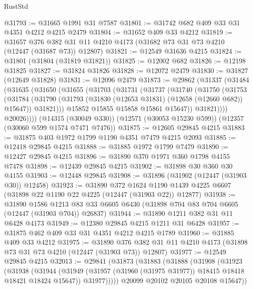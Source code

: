 \begin{lexlean}{RustStd}
\begin{coremodule}
@31793 := @31665 @1991 @31 @7587
@31801 := @31742 @682 @409 @33 @31 @4351 @4212 @4215 @2479
@31804 := @31652 @409 @33 @4212
@31819 := @31657
    @376
    @382
    @31
    @11
    @4210
    @4173
    (@31682 @73 @31 @73 @4210 (@12447 (@31687 @73)) @12807)
@31821 := @12549 @31636 @4215
@31824 := @31801 (@31804 (@31819 @31821))
@31825 := @12002 @682
@31826 := @12198 @31825
@31827 := @31824 @31826
@31828 := @12072 @2479
@31830 := @31827 (@12649 @31828)
@31831 := @12096 @2479
@31873 := @29862
    (@31337
      (@31484
        (@31635
          (@31650
            (@31655
              (@31703
                (@31731
                  (@31737
                    (@31740
                      (@31750
                        (@31753
                          (@31784
                            (@31790
                              (@31793 (@31830 (@12653 @31831) (@12658 (@12660 @682)) @15647))
                              @31821)))
                        @15852
                        @15855
                        @15858
                        @15861
                        @15647))
                    @31821))))
            @20026))))
    (@14315 (@30049 @330))
    (@12571 (@30053 @15230 @599))
    (@12357 (@30060 @599 @1574 @7471 @7476))
@31875 := @12605 @29845 @4215
@31883 := @31875 @403 @1972 @1799 @1190 @4351 @7479 @4215 @2093
@31885 := @12418 @29845 @4215
@31888 := @31885 @1972 @1799 @7479
@31890 := @12427 @29845 @4215
@31896 := @31890 @370 @1971 @360 @1798 @4155 @7478
@31898 := @12439 @29845 @4215
@31902 := @31898 @30 @360 @30 @4155
@31903 := @12448 @29845
@31908 := @31896 (@31902 (@12447 (@31903 @30)) @12458)
@31923 := @31890
    @372
    @1624
    @1190
    @1439
    @4225
    @6607
    (@31898 @22 @1190 @22 @4225 (@12447 (@31903 @22)) @12877)
@31938 := @31890
    @1586
    @1213
    @83
    @33
    @6605
    @6430
    (@31898 @704 @83 @704 @6605 (@12447 (@31903 @704)) @26837)
@31944 := @31890 @1211 @382 @31 @11 @6428 @4173
@31949 := @12380 @29845 @4215 @1211 @31 @6428
@31957 := @31875 @462 @409 @33 @31 @4351 @4212 @4215 @1789
@31960 := @31885 @409 @33 @4212
@31975 := @31890
    @376
    @382
    @31
    @11
    @4210
    @4173
    (@31898 @73 @31 @73 @4210 (@12447 (@31903 @73)) @12807)
@31977 := @12549 @29845 @4215
@32013 := @29841
    (@31873
      (@31883
        (@31888
          (@31908
            (@31923
              (@31938
                (@31944
                  (@31949 (@31957 (@31960 (@31975 @31977)) @18415 @18418 @18421 @18424 @15647))
                  @31977)))))
        @20099
        @20102
        @20105
        @20108
        @15647))

\end{coremodule}
\end{lexlean}
